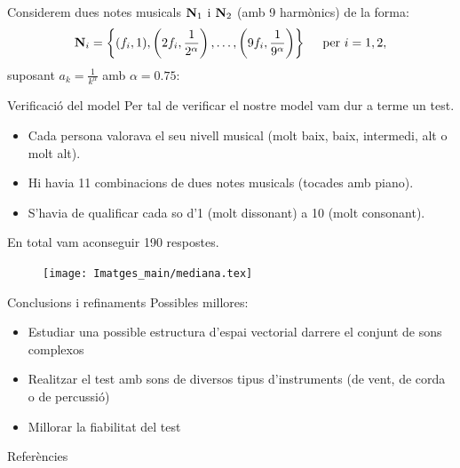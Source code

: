 \documentclass[10pt,hyperref={colorlinks,linkcolor=black,citecolor=blue!80,urlcolor=blue!60}]{beamer} %
\theoremstyle{definition}
\newcommand{\0}{\ensuremath{\vb{0}}}
\newcommand{\N}{\ensuremath{\vb{N}}}
\begin{document}
\begin{frame}
    Considerem dues notes musicals $\N_1$ i $\N_2$ (amb 9 harmònics) de la forma: $$\N_i=\left\{(f_i,1),\left(2f_i,\frac{1}{2^\alpha}\right),\ldots,\left(9f_i,\frac{1}{9^\alpha}\right)\right\}\quad\text{ per }i=1,2,$$ suposant $a_k=\frac{1}{k^\alpha}$ amb $\alpha=0.75$:\pause
    \begin{figure}
        \centering
        
    \end{figure}
\end{frame}
\begin{frame}{Verificació del model}
    Per tal de verificar el nostre model vam dur a terme un test. \pause
    \begin{itemize}
        \item Cada persona valorava el seu nivell musical (molt baix, baix, intermedi, alt o molt alt).\pause
        \item Hi havia 11 combinacions de dues notes musicals (tocades amb piano).\pause
        \item S'havia de qualificar cada so d'1 (molt dissonant) a 10 (molt consonant).
    \end{itemize}\pause
    En total vam aconseguir 190 respostes.
    \begin{figure}
        \centering
        \texttt{[image: Imatges\_main/mediana.tex]}
    \end{figure}
\end{frame}
\begin{frame}{Conclusions i refinaments}
    Possibles millores:\pause
    \begin{itemize}
        \item Estudiar una possible estructura d'espai vectorial darrere el conjunt de sons complexos\pause
        \item Realitzar el test amb sons de diversos tipus d'instruments (de vent, de corda o de percussió)\pause
        \item Millorar la fiabilitat del test
    \end{itemize}
\end{frame}
\begin{frame}[noframenumbering]{Referències}
    \printbibliography[heading=none]
\end{frame}
\end{document}
